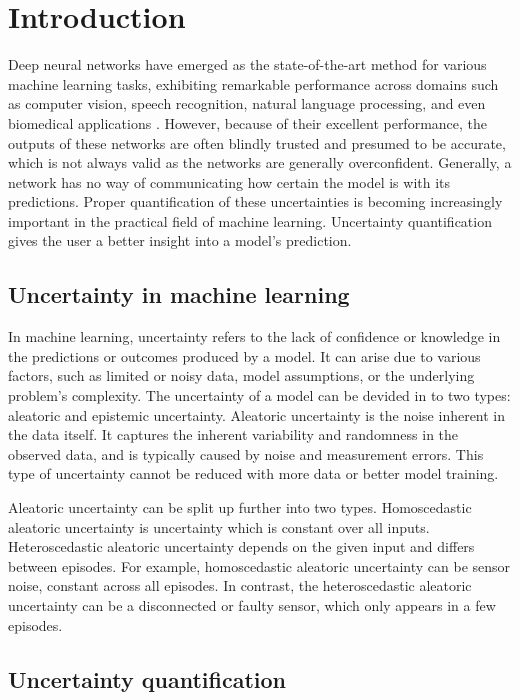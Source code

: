 \section{Introduction}\label{sec:introduction}

Deep neural networks have emerged as the state-of-the-art method for various machine learning tasks, exhibiting remarkable performance across domains such as computer vision, speech recognition, natural language processing, and even biomedical applications \citep{yoo2015deep, zheng2015investigating}. However, because of their excellent performance, the outputs of these networks are often blindly trusted and presumed to be accurate, which is not always valid as the networks are generally overconfident. Generally, a network has no way of communicating how certain the model is with its predictions. Proper quantification of these uncertainties is becoming increasingly important in the practical field of machine learning. Uncertainty quantification gives the user a better insight into a model's prediction.

\subsection{Uncertainty in machine learning}

In machine learning, uncertainty refers to the lack of confidence or knowledge in the predictions or outcomes produced by a model. It can arise due to various factors, such as limited or noisy data, model assumptions, or the underlying problem's complexity. The uncertainty of a model can be devided in to two types: aleatoric and epistemic uncertainty. Aleatoric uncertainty is the noise inherent in the data itself. It captures the inherent variability and randomness in the observed data, and is typically caused by noise and measurement errors. This type of uncertainty cannot be reduced with more data or better model training.

Aleatoric uncertainty can be split up further into two types. Homoscedastic aleatoric uncertainty is uncertainty which is constant over all inputs. Heteroscedastic aleatoric uncertainty depends on the given input and differs between episodes. For example, homoscedastic aleatoric uncertainty can be sensor noise, constant across all episodes. In contrast, the heteroscedastic aleatoric uncertainty can be a disconnected or faulty sensor, which only appears in a few episodes.

\subsection{Uncertainty quantification}

